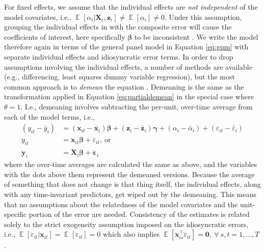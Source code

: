 \documentclass[]{interact}
\theoremstyle{plain}%
\theoremstyle{definition}
\theoremstyle{remark}
\begin{document}
For fixed effects, we assume that the individual effects are
\textit{not independent} of the model covariates, i.e.,
\(\mathop{\mathrm{\mathbb{E}}}[\alpha_{i}|\bm{X}_{i},\bm{z}_{i}] \ne \mathop{\mathrm{\mathbb{E}}}[\alpha_{i}] \ne 0\).
Under this assumption, grouping the individual effects in with the
composite error will cause the coefficients of interest, here
specifically \(\bm{\beta}\) to be inconsistent
\citep{Wooldridge2002, Wooldridge2012}. We write the model therefore
again in terms of the general panel model in Equation \eqref{eq:gpm}
with separate individual effects and idiosyncratic error terms. In order
to drop assumptions involving the individual effects, a number of
methods are available (e.g., differencing, least squares dummy variable
regression), but the most common approach is to \textit{demean} the
equation \citep{Bruederl2015}. Demeaning is the same as the
transformation applied in Equation \eqref{eq:partialdemean} in the
special case where \(\theta = 1\). I.e., demeaning involves subtracting
the per-unit, over-time average from each of the model terms, i.e.,
\begin{align}
(y_{it} - \bar{y}_{i}) & = (\bm{x}_{it} - \bar{\bm{x}}_{i})\bm{\beta} + (\bm{z}_{i} - \bar{\bm{z}}_{i})\bm{\gamma} + (\alpha_{i} - \bar{\alpha}_{i}) + (\varepsilon_{it} - \bar{\varepsilon}_{i}) \\
\ddot{y}_{it} & = \bm{\ddot{x}}_{it}\bm{\beta} + \ddot{\varepsilon}_{it}, \ \text{or} \\
\bm{\ddot{y}}_{i} & = \bm{\ddot{X}}_{i}\bm{\beta} + \bm{\ddot{\varepsilon}}_{i} \label{eq:fe}
\end{align} where the over-time averages are calculated the same as
above, and the variables with the dots above them represent the demeaned
versions. Because the average of something that does not change is that
thing itself, the individual effects, along with any time-invariant
predictors, get wiped out by the demeaning. This means that no
assumptions about the relatedness of the model covariates and the
unit-specific portion of the error are needed. Consistency of the
estimates is related solely to the strict exogeneity assumption imposed
on the idiosyncratic errors, i.e.,
\(\mathop{\mathrm{\mathbb{E}}}[\ddot{\varepsilon}_{it}|\bm{\ddot{x}}_{it}] = \mathop{\mathrm{\mathbb{E}}}[\ddot{\varepsilon}_{it}] = 0\)
which also implies
\(\mathop{\mathrm{\mathbb{E}}}[\bm{\ddot{x}}_{is}^{\intercal}\ddot{\varepsilon}_{it}] = \bm{0}, \ \forall \ s, t = 1, ..., T\)
\citep{Bruederl2015, Wooldridge2002}.
\end{document}
